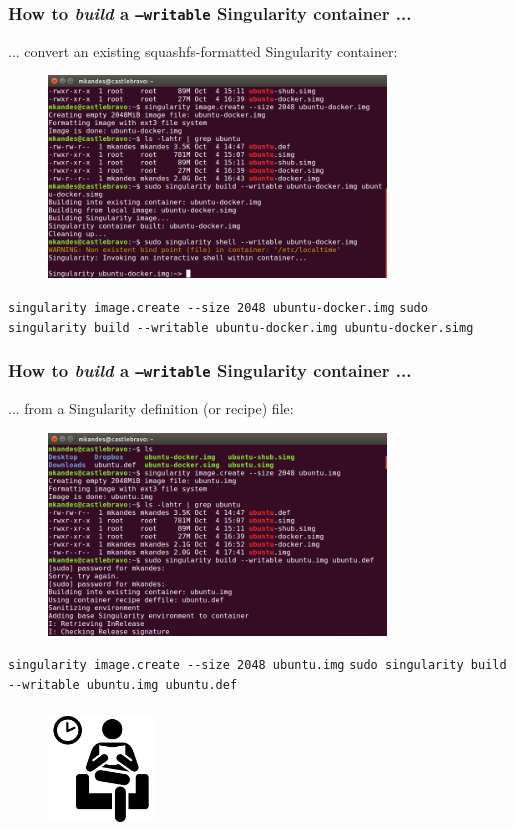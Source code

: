 \documentclass{beamer}
\begin{document}
\begin{frame}
   \frametitle{How to \textit{build} a \texttt{--writable} Singularity container ...}
   ... convert an existing squashfs-formatted Singularity container:
   \begin{figure}[htbp]
      \includegraphics[width=0.8\textwidth]{images/singularity-build-writable-convert-from-simg.png}
   \end{figure}
   \lstinline{singularity image.create --size 2048 ubuntu-docker.img}
   \lstinline{sudo singularity build --writable ubuntu-docker.img ubuntu-docker.simg}
\end{frame}

\begin{frame}
   \frametitle{How to \textit{build} a \texttt{--writable} Singularity container ...}
   ... from a Singularity definition (or recipe) file:
   \begin{figure}[htbp]
      \includegraphics[width=0.8\textwidth]{images/singularity-build-writable-deffile-start.png}
   \end{figure}
   \lstinline{singularity image.create --size 2048 ubuntu.img}
   \lstinline{sudo singularity build --writable ubuntu.img ubuntu.def}
\end{frame}

\begin{frame}
   \frametitle{}
   \begin{figure}[htbp]
      \includegraphics[width=0.25\textwidth]{images/waiting-icon.png}
   \end{figure}
\end{frame}
\end{document}
